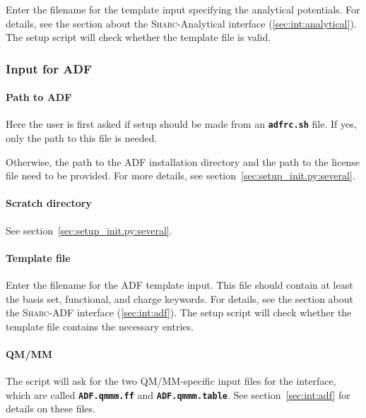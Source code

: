 \documentclass[a4paper,10pt,DIV=15,openany]{scrbook}
\newcommand{\sharc}{\textsc{Sharc}}
\newcommand{\ttt}[1]{\textbf{\texttt{#1}}}
\begin{document}
Enter the filename for the template input specifying the analytical potentials. For details, see the section about the \sharc-Analytical interface (\ref{sec:int:analytical}). The setup script will check whether the template file is valid. 


\subsubsection{Input for \textsc{ADF}}\label{sec:setup_init.py:adf}

\paragraph{Path to \textsc{ADF}}

Here the user is first asked if setup should be made from an \ttt{adfrc.sh} file. If yes, only the path to this file is needed.

Otherwise, the path to the ADF installation directory and the path to the license file need to be provided.
For more details, see section~\ref{sec:setup_init.py:several}.

\paragraph{Scratch directory}

See section~\ref{sec:setup_init.py:several}.

\paragraph{Template file}

Enter the filename for the \textsc{ADF} template input. This file should contain at least the basis set, functional, and charge keywords. For details, see the section about the \sharc-\textsc{ADF} interface (\ref{sec:int:adf}). The setup script will check whether the template file contains the necessary entries. 

\paragraph{QM/MM}

The script will ask for the two QM/MM-specific input files for the interface, which are called \ttt{ADF.qmmm.ff} and \ttt{ADF.qmmm.table}.
See section~\ref{sec:int:adf} for details on these files.
\end{document}
